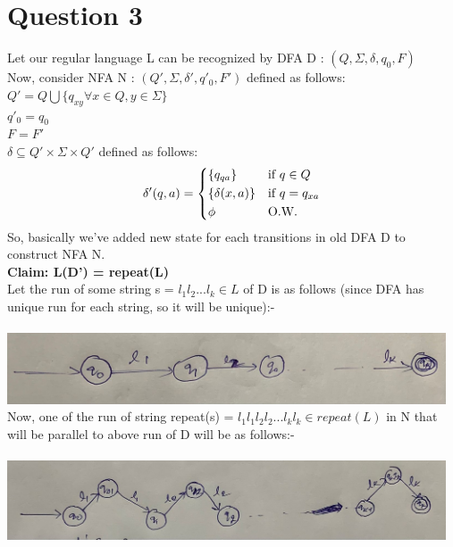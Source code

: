 \documentclass{article}
\begin{document}
\pagebreak
\section{Question 3}

Let our regular language L can be recognized by DFA D : $(Q, \Sigma, \delta, q_0 , F )$ \\

Now, consider NFA N :  $(Q', \Sigma, \delta', q'_0 , F' )$ defined as follows:\\
$Q' = Q \bigcup \{q_{xy} \forall x \in Q, y \in  \Sigma \}$\\
$q'_0 = q_0$\\
$F = F'$\\
$\delta \subseteq Q' \times \Sigma \times Q'$ defined as follows:\\

\begin{equation}
    \delta' (q,a) = 
    \begin{cases*}
        \{q_{qa}\} & if $ q \in Q $ \\
        \{\delta(x,a)\} & if $ q = q_{xa}$\\
        \phi & O.W.
    \end{cases*}
\end{equation}
 So, basically we've added new state for each transitions in old DFA D to construct NFA N.\\

\textbf{Claim: L(D') = repeat(L)}\\
Let the run of some string s = $l_1l_2...l_k \in L$ of D is as follows (since DFA has unique run for each string, so it will be unique):- \\ \\
\includegraphics[width=13cm]{1.jpeg}\\
Now, one of the run of string repeat(s) = $l_1l_1l_2l_2...l_kl_k \in repeat(L)$ in N that will be parallel to above run of D will be as follows:- \\\\
\includegraphics[width=13cm]{2.jpeg}\\
\end{document}
